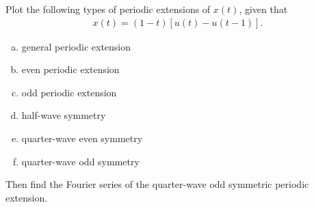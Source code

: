 \documentclass{report}
\begin{document}
\begin{example}
    Plot the following types of periodic extensions of $x(t)$, given that 
    \begin{align*}
        x(t)=(1-t)[u(t)-u(t-1)].
    \end{align*}
    \begin{enumerate}[(a)]
        \item general periodic extension
        \item even periodic extension
        \item odd periodic extension
        \item half-wave symmetry
        \item quarter-wave even symmetry
        \item quarter-wave odd symmetry
    \end{enumerate}
    Then find the Fourier series of the quarter-wave odd symmetric periodic extension.
\end{example}
\end{document}
